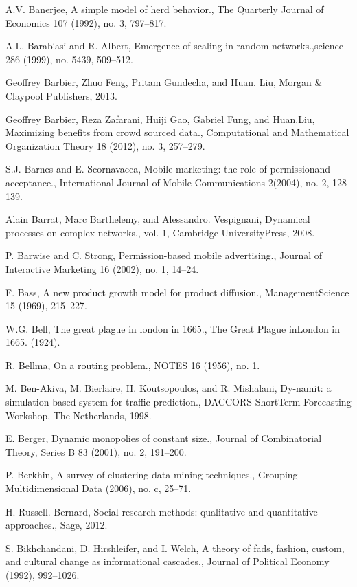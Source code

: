 \begin{thebibliography}{999}
 A.V. Banerjee, A simple model of herd behavior., The Quarterly Journal of Economics 107 (1992), no. 3, 797–817.

 A.L. Barab′asi and R. Albert, Emergence of scaling in random networks.,science 286 (1999), no. 5439, 509–512.

 Geoffrey Barbier, Zhuo Feng, Pritam Gundecha, and Huan. Liu, Morgan \& Claypool Publishers, 2013.

 Geoffrey Barbier, Reza Zafarani, Huiji Gao, Gabriel Fung, and Huan.Liu, Maximizing benefits from crowd sourced data., Computational and Mathematical Organization Theory 18 (2012), no. 3, 257–279.

 S.J. Barnes and E. Scornavacca, Mobile marketing: the role of permissionand acceptance., International Journal of Mobile Communications 2(2004), no. 2, 128–139.

 Alain Barrat, Marc Barthelemy, and Alessandro. Vespignani, Dynamical processes on complex networks., vol. 1, Cambridge UniversityPress, 2008.

 P. Barwise and C. Strong, Permission-based mobile advertising., Journal of Interactive Marketing 16 (2002), no. 1, 14–24.

 F. Bass, A new product growth model for product diffusion., ManagementScience 15 (1969), 215–227.

 W.G. Bell, The great plague in london in 1665., The Great Plague inLondon in 1665. (1924).

 R. Bellma, On a routing problem., NOTES 16 (1956), no. 1.

 M. Ben-Akiva, M. Bierlaire, H. Koutsopoulos, and R. Mishalani, Dy-namit: a simulation-based system for traffic prediction., DACCORS ShortTerm Forecasting Workshop, The Netherlands, 1998.

 E. Berger, Dynamic monopolies of constant size., Journal of Combinatorial Theory, Series B 83 (2001), no. 2, 191–200.

 P. Berkhin, A survey of clustering data mining techniques., Grouping Multidimensional Data (2006), no. c, 25–71.

 H. Russell. Bernard, Social research methods: qualitative and quantitative approaches., Sage, 2012.

 S. Bikhchandani, D. Hirshleifer, and I. Welch, A theory of fads, fashion, custom, and cultural change as informational cascades., Journal of Political Economy (1992), 992–1026.


\end{thebibliography}
